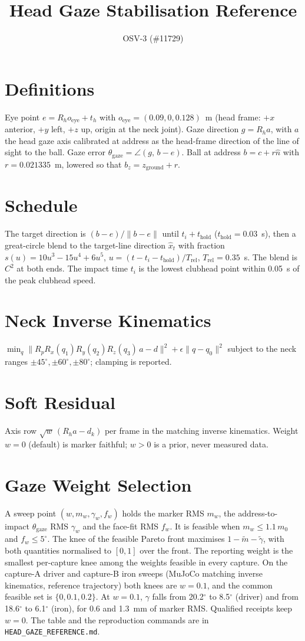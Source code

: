\documentclass[11pt]{article}
\title{Head Gaze Stabilisation Reference}
\date{OSV-3 (\#11729)}
\begin{document}
\maketitle
\section{Definitions}
Eye point $e = R_{h} o_{\mathrm{eye}} + t_{h}$ with $o_{\mathrm{eye}} = (0.09, 0, 0.128)$~m
(head frame: $+x$ anterior, $+y$ left, $+z$ up, origin at the neck joint).
Gaze direction $g = R_{h} a$, with $a$ the head gaze axis calibrated at address as the
head-frame direction of the line of sight to the ball. Gaze error
$\theta_{\mathrm{gaze}} = \angle(g,\, b - e)$.
Ball at address $b = c + r\hat n$ with $r = 0.021335$~m, lowered so that $b_z = z_{\mathrm{ground}} + r$.
\section{Schedule}
The target direction is $(b-e)/\lVert b-e\rVert$ until $t_i + t_{\mathrm{hold}}$
($t_{\mathrm{hold}} = 0.03$~s), then a great-circle blend to the target-line direction
$\hat x_t$ with fraction $s(u) = 10u^3 - 15u^4 + 6u^5$,
$u = (t - t_i - t_{\mathrm{hold}})/T_{\mathrm{rel}}$, $T_{\mathrm{rel}} = 0.35$~s.
The blend is $C^2$ at both ends. The impact time $t_i$ is the lowest clubhead point within
0.05~s of the peak clubhead speed.
\section{Neck Inverse Kinematics}
$\min_q \lVert R_{p} R_x(q_1) R_y(q_2) R_z(q_3)\, a - d \rVert^2 + \epsilon \lVert q - q_0 \rVert^2$
subject to the neck ranges $\pm 45^\circ, \pm 60^\circ, \pm 80^\circ$; clamping is reported.
\section{Soft Residual}
Axis row $\sqrt{w}\,(R_{h} a - d_k)$ per frame in the matching inverse kinematics.
Weight $w = 0$ (default) is marker faithful; $w > 0$ is a prior, never measured data.
\section{Gaze Weight Selection}
A sweep point $(w, m_w, \gamma_w, f_w)$ holds the marker RMS $m_w$, the
address-to-impact $\theta_{\mathrm{gaze}}$ RMS $\gamma_w$ and the face-fit RMS $f_w$.
It is feasible when $m_w \le 1.1\, m_0$ and $f_w \le 5^\circ$. The knee of the feasible
Pareto front maximises $1 - \tilde m - \tilde\gamma$, with both quantities normalised to
$[0, 1]$ over the front. The reporting weight is the smallest per-capture knee among the
weights feasible in every capture. On the capture-A driver and capture-B iron sweeps
(MuJoCo matching inverse kinematics, reference trajectory) both knees are $w = 0.1$, and
the common feasible set is $\{0, 0.1, 0.2\}$. At $w = 0.1$, $\gamma$ falls from
20.2$^\circ$ to 8.5$^\circ$ (driver) and from 18.6$^\circ$ to 6.1$^\circ$ (iron), for
0.6 and 1.3~mm of marker RMS. Qualified receipts keep $w = 0$. The table and the
reproduction commands are in \texttt{HEAD\_GAZE\_REFERENCE.md}.
\end{document}
